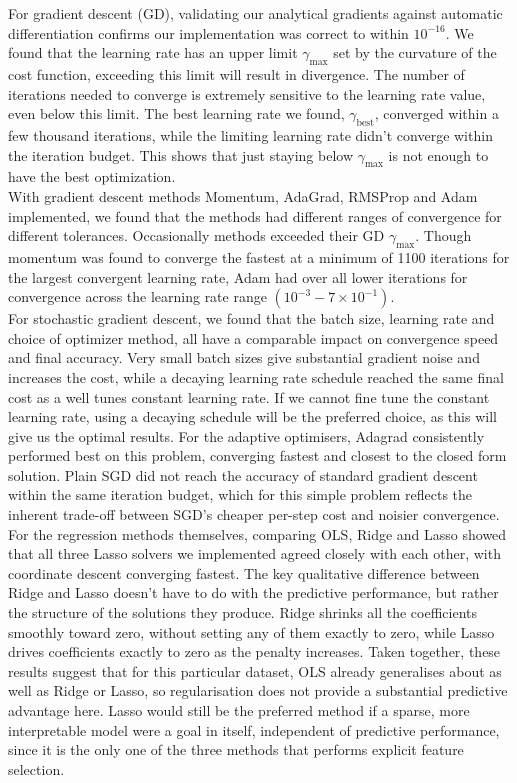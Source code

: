 \documentclass[reprint,english,notitlepage]{revtex4-2}  %
\begin{document}
For gradient descent (GD), validating our analytical gradients against automatic differentiation confirms our implementation was correct to within $10^{-16}$. We found that the learning rate has an upper limit $\gamma_{\text{max}}$ set by the curvature of the cost function, exceeding this limit will result in divergence. The number of iterations needed to converge is extremely sensitive to the learning rate value, even below this limit. The best learning rate we found, $\gamma_{\text{best}}$, converged within a few thousand iterations, while the limiting learning rate didn't converge within the iteration budget. This shows that just staying below $\gamma_{\text{max}}$ is not enough to have the best optimization. \\
With gradient descent methods Momentum, AdaGrad, RMSProp and Adam implemented, we found that the methods had different ranges of convergence for different tolerances. Occasionally methods exceeded their GD $\gamma_\text{max}$. Though momentum was found to converge the fastest at a minimum of 1100 iterations for the largest convergent learning rate, Adam had over all lower iterations for convergence across the learning rate range $(10^{-3}-7\times10^{-1})$. \\
For stochastic gradient descent, we found that the batch size, learning rate and choice of optimizer method, all have a comparable impact on convergence speed and final accuracy. Very small batch sizes give substantial gradient noise and increases the cost, while a decaying learning rate schedule reached the same final cost as a well tunes constant learning rate. If we cannot fine tune the constant learning rate, using a decaying schedule will be the preferred choice, as this will give us the optimal results. For the adaptive optimisers, Adagrad consistently performed best on this problem, converging fastest and closest to the closed form solution. Plain SGD did not reach the accuracy of standard gradient descent within the same iteration budget, which for this simple problem reflects the inherent trade-off between SGD's cheaper per-step cost and noisier convergence. \\
For the regression methods themselves, comparing OLS, Ridge and Lasso showed that all three Lasso solvers we implemented agreed closely with each other, with coordinate descent converging fastest. The key qualitative difference between Ridge and Lasso doesn't have to do with the predictive performance, but rather the structure of the solutions they produce. Ridge shrinks all the coefficients smoothly toward zero, without setting any of them exactly to zero, while Lasso drives coefficients exactly to zero as the penalty increases. Taken together, these results suggest that for this particular dataset, OLS already generalises about as well as Ridge or Lasso, so regularisation does not provide a substantial predictive advantage here. Lasso would still be the preferred method if a sparse, more interpretable model were a goal in itself, independent of predictive performance, since it is the only one of the three methods that performs explicit feature selection.\\
\end{document}
